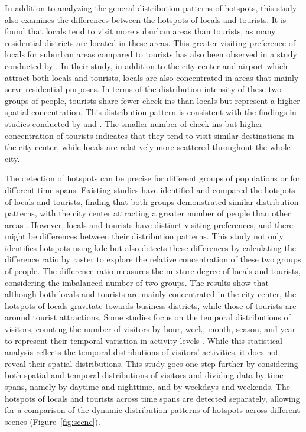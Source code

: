 \documentclass{article}
\theoremstyle{remark}
\begin{document}
In addition to analyzing the general distribution patterns of hotspots, this study also examines the differences between the hotspots of locals and tourists. It is found that locals tend to visit more suburban areas than tourists, as many residential districts are located in these areas. This greater visiting preference of locals for suburban areas compared to tourists has also been observed in a study conducted by \cite{su_analysing_2020}. In their study, in addition to the city center and airport which attract both locals and tourists, locals are also concentrated in areas that mainly serve residential purposes. In terms of the distribution intensity of these two groups of people, tourists share fewer check-ins than locals but represent a higher spatial concentration. This distribution pattern is consistent with the findings in studies conducted by \cite{garcia-palomares_identification_2015} and \cite{su_analysing_2020}. The smaller number of check-ins but higher concentration of tourists indicates that they tend to visit similar destinations in the city center, while locals are relatively more scattered throughout the whole city.

The detection of hotspots can be precise for different groups of populations or for different time spans. Existing studies have identified and compared the hotspots of locals and tourists, finding that both groups demonstrated similar distribution patterns, with the city center attracting a greater number of people than other areas \citep{garcia-palomares_identification_2015,su_analysing_2020}. However, locals and tourists have distinct visiting preferences, and there might be differences between their distribution patterns. This study not only identifies hotspots using \acrshort{kde} but also detects these differences by calculating the difference ratio by raster to explore the relative concentration of these two groups of people. The difference ratio measures the mixture degree of locals and tourists, considering the imbalanced number of two groups. The results show that although both locals and tourists are mainly concentrated in the city center, the hotspots of locals gravitate towards business districts, while those of tourists are around tourist attractions. Some studies focus on the temporal distributions of visitors, counting the number of visitors by hour, week, month, season, and year to represent their temporal variation in activity levels \citep{li_photography-based_2011,su_analysing_2020}. While this statistical analysis reflects the temporal distributions of visitors' activities, it does not reveal their spatial distributions. This study goes one step further by considering both spatial and temporal distributions of visitors and dividing data by time spans, namely by daytime and nighttime, and by weekdays and weekends. The hotspots of locals and tourists across time spans are detected separately, allowing for a comparison of the dynamic distribution patterns of hotspots across different scenes (Figure~\ref{fig:scene}).
\end{document}
